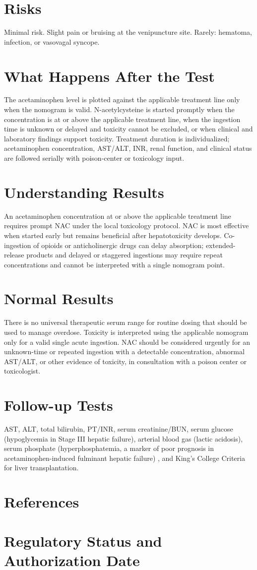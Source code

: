 \section*{Risks}
Minimal risk. Slight pain or bruising at the venipuncture site. Rarely: hematoma, infection, or vasovagal syncope.
\section*{What Happens After the Test}
The acetaminophen level is plotted against the applicable treatment line only when the nomogram is valid. N-acetylcysteine is started promptly when the concentration is at or above the applicable treatment line, when the ingestion time is unknown or delayed and toxicity cannot be excluded, or when clinical and laboratory findings support toxicity. Treatment duration is individualized; acetaminophen concentration, AST/ALT, INR, renal function, and clinical status are followed serially with poison-center or toxicology input.
\section*{Understanding Results}
An acetaminophen concentration at or above the applicable treatment line requires prompt NAC under the local toxicology protocol. NAC is most effective when started early but remains beneficial after hepatotoxicity develops. Co-ingestion of opioids or anticholinergic drugs can delay absorption; extended-release products and delayed or staggered ingestions may require repeat concentrations and cannot be interpreted with a single nomogram point.
\section*{Normal Results}
There is no universal therapeutic serum range for routine dosing that should be used to manage overdose. Toxicity is interpreted using the applicable nomogram only for a valid single acute ingestion. NAC should be considered urgently for an unknown-time or repeated ingestion with a detectable concentration, abnormal AST/ALT, or other evidence of toxicity, in consultation with a poison center or toxicologist.
\section*{Follow-up Tests}
AST, ALT, total bilirubin, PT/INR, serum creatinine/BUN, serum glucose (hypoglycemia in Stage III hepatic failure), arterial blood gas (lactic acidosis), serum phosphate (hyperphosphatemia, a marker of poor prognosis in acetaminophen-induced fulminant hepatic failure) \cite{larson2005acetaminophen}, and King's College Criteria for liver transplantation.
\section*{References}


\clearpage
\section*{Regulatory Status and Authorization Date}

\clearpage
